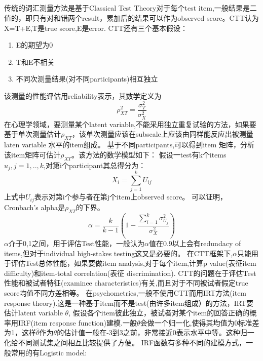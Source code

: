 \documentclass[12pt]{article}
\begin{document}
\subsection{\textbf{}}
传统的词汇测量方法是基于Classical Test Theory对于每个test item,一般结果是二值的，即只有对和错两个result，累加后的结果可以作为observed score。CTT认为X=T+E,T是true score,E是error.
CTT还有三个基本假设：
\begin{enumerate}
\item{E的期望为0}
\item{T和E不相关}
\item{不同次测量结果(对不同participants)相互独立}
\end{enumerate}
该测量的性能评估用reliability表示，其数学定义为
\begin{equation}
\rho_{XT}^2=\frac{\sigma_T^2}{\sigma_X^2}
\end{equation}
在心理学领域，要测量某个latent variable,不能采用独立重复试验的方法，如果要基于单次测量估计$\rho_{XT}$，该单次测量应该在subscale上应该由同样能反应出被测量laten variable 水平的item组成。
基于不同participants,可以得到item 矩阵，分析该item矩阵可估计$\rho_{XT}$。该方法的数学模型如下：
假设一test有k个items $u_j,j=1,..,k$,对第i个participant其总得分为：
\begin{equation}
X_i=\sum_{j=1}^k U_{ij}
\end{equation}
上式中$U_{ij}$表示对第i个参与者在第j个item上observed score。
可以证明，Cronbach's alpha是$\rho_{XT}$的下界。
\begin{equation}
\alpha=\frac{k}{k-1}(1-\frac{\sum_{i=1}^k \sigma_{U_j}^2}{\sigma_X^2})
\end{equation}
$\alpha$介于0,1之间，用于评估Test性能，一般认为$\alpha$值在0.9以上会有redundacy of items,但对于individual high-stakes testing这又是必要的。
在CTT框架下,$\alpha$只能用于评估Test总体性能，如果要做item analysis,对于每个item,计算p value(表征item difficulty)和item-total correlation(表征 discrimination).
CTT的问题在于评估Test性能和被试者特征(examinee characteristics)有关,而且对于不同被试者假定true score均值不同方差相等。
在psychometrics,一般不使用CTT而用IRT方法(item response theory).这是一种基于item而不是test(由许多item组成）的方法，IRT要估计latent variable $\theta$,
假设各个item彼此独立，被试者对某个item的回答正确的概率用IRF(item response function)建模.一般$\theta$会做一个归一化,使得其均值为0标准差为1，这样$\hat{\theta}$作为$\theta$的估计值一般在-3到3之前，非常接近0表示水平中等。这种归一化给不同测试集之间相互比较提供了方便。
IRF函数有多种不同的建模方式，一般常用的有Logistic model:
\end{document}
